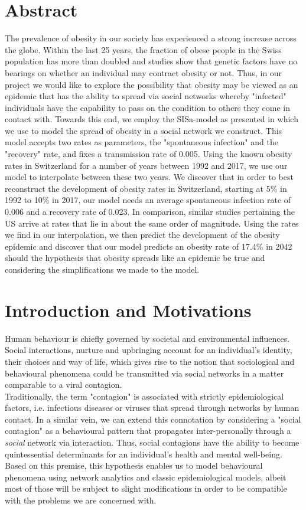 \documentclass[11pt]{article}
\begin{document}
\section{Abstract}
The prevalence of obesity in our society has experienced a strong increase across the globe. Within the last 25 years, the fraction of obese people in the Swiss population has more than doubled\cite{spreadOfObesityPaper} and studies show that genetic factors have no bearings on whether an individual may contract obesity or not\cite{infectiousDiseaseModeling}. Thus, in our project we would like to explore the possibility that obesity may be viewed as an epidemic that has the ability to spread via social networks whereby "infected" individuals have the capability to pass on the condition to others they come in contact with. Towards this end, we employ the SISa-model as presented in \cite{infectiousDiseaseModeling} which we use to model the spread of obesity in a social network we construct. This model accepts two rates as parameters, the "spontaneous infection" and the "recovery" rate, and fixes a transmission rate of 0.005. Using the known obesity rates in Switzerland for a number of years between 1992 and 2017, we use our model to interpolate between these two years. We discover that in order to best reconstruct the development of obesity rates in Switzerland, starting at 5\% in 1992 to 10\% in 2017, our model needs an average spontaneous infection rate of 0.006 and a recovery rate of 0.023. In comparison, similar studies pertaining the US arrive at rates that lie in about the same order of magnitude. Using the rates we find in our interpolation, we then predict the development of the obesity epidemic and discover that our model predicts an obesity rate of 17.4\% in 2042 should the hypothesis that obesity spreads like an epidemic be true and considering the simplifications we made to the model. 
\section{Introduction and Motivations}
Human behaviour is chiefly governed by societal and environmental influences. Social interactions, nurture and upbringing account for an individual’s identity, their choices and way of life, which gives rise to the notion that sociological and behavioural phenomena could be transmitted via social networks in a matter comparable to a viral contagion.\\

Traditionally, the term "contagion" is associated with strictly epidemiological factors, i.e. infectious diseases or viruses that spread through networks by human contact. In a similar vein, we can extend this connotation by considering a "social contagion" as a behavioural pattern that propagates inter-personally through a \textit{social} network via interaction. Thus, social contagions have the ability to become quintessential determinants for an individual’s health and mental well-being. Based on this premise, this hypothesis enables us to model behavioural phenomena using network analytics and classic epidemiological models, albeit most of those will be subject to slight modifications in order to be compatible with the problems we are concerned with.\\
\end{document}
